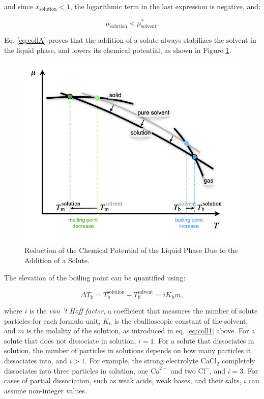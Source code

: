 \documentclass[
  9pt,
]{extbook}
\theoremstyle{definition}
\theoremstyle{definition}
\theoremstyle{definition}
\theoremstyle{remark}
\begin{document}
and since \(x_{\text{solution}}<1\), the logarithmic term in the last expression is negative, and:

\begin{equation}
\mu_{\text{solution}} < \mu_{\text{solvent}}^*. 
\label{eq:collB}
\end{equation}

Eq. \eqref{eq:collA} proves that the addition of a solute always stabilizes the solvent in the liquid phase, and lowers its chemical potential, as shown in Figure \ref{fig:FigSol2}.

\begin{figure}

{\centering \includegraphics[width=0.6\linewidth]{./img/OEP_Figures.034} 

}

\caption{Reduction of the Chemical Potential of the Liquid Phase Due to the Addition of a Solute.}\label{fig:FigSol2}
\end{figure}

The elevation of the boiling point can be quantified using:

\begin{equation}
\Delta T_{\text{b}}=T_{\text{b}}^{\text{solution}}-T_{\text{b}}^{\text{solvent}}=iK_{\text{b}}m,
\label{eq:coll3}
\end{equation}

where \(i\) is the \emph{van 't Hoff factor}, a coefficient that measures the number of solute particles for each formula unit, \(K_{\text{b}}\) is the ebullioscopic constant of the solvent, and \(m\) is the molality of the solution, as introduced in eq. \eqref{eq:coll1} above. For a solute that does not dissociate in solution, \(i=1\). For a solute that dissociates in solution, the number of particles in solutions depends on how many particles it dissociates into, and \(i>1\). For example, the strong electrolyte \(\mathrm{Ca}\mathrm{Cl}_2\) completely dissociates into three particles in solution, one \(\mathrm{Ca}^{2+}\) and two \(\mathrm{Cl}^-\), and \(i=3\). For cases of partial dissociation, such as weak acids, weak bases, and their salts, \(i\) can assume non-integer values.
\end{document}
